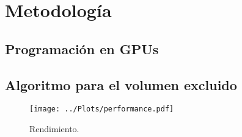 \chapter{Metodología}
\label{cap:methodology}

\section{Programación en GPUs}

\section{Algoritmo para el volumen excluido}

\begin{figure}
  \centering
  \texttt{[image: ../Plots/performance.pdf]}
  \caption{Rendimiento.}
  \label{fig:performance}
\end{figure}
